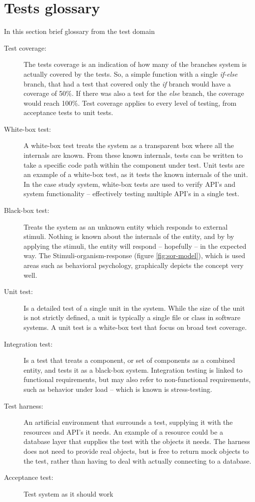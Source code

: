\section{Tests glossary}
In this section brief glossary from the test domain
\begin{description}
  \item[Test coverage:] The tests coverage is an indication of how many of the branches system is actually covered by the tests. So, a simple function with a single \emph{if-else} branch, that had a test that covered only the \emph{if} branch would have a coverage of 50\%. If there was also a test for the \emph{else} branch, the coverage would reach 100\%. Test coverage applies to every level of testing, from acceptance tests to unit tests.
  \item[White-box test:] A white-box test treats the system as a transparent box where all the internals are known. From these known internals, tests can be written to take a specific code path within the component under test. Unit tests are an example of a white-box test, as it tests the known internals of the unit. In the case study system, white-box tests are used to verify API's and system functionality -- effectively testing multiple API's in a single test.
  \item[Black-box test:] Treats the system as an unknown entity which responds to external stimuli. Nothing is known about the internals of the entity, and by by applying the stimuli, the entity will respond -- hopefully -- in the expected way. The Stimuli-organism-response (figure \ref{fig:sor-model}), which is used areas such as behavioral psychology, graphically depicts the concept very well.
  \item[Unit test:] Is a detailed test of a single unit in the system. While the size of the unit is not strictly defined, a unit is typically a single file or class in software systems. A unit test is a white-box test that focus on broad test coverage.
  \item[Integration test:] Is a test that treats a component, or set of components as a combined entity, and tests it as a black-box system. Integration testing is linked to functional requirements, but may also refer to non-functional requirements, such as behavior under load -- which is known is stress-testing.
  \item[Test harness:] An artificial environment that surrounds a test, supplying it with the resources and API's it needs. An example of a resource could be a database layer that supplies the test with the objects it needs. The harness does not need to provide real objects, but is free to return mock objects to the test, rather than having to deal with actually connecting to a database.
  \item[Acceptance test:] Test system as it should work %
\end{description}
